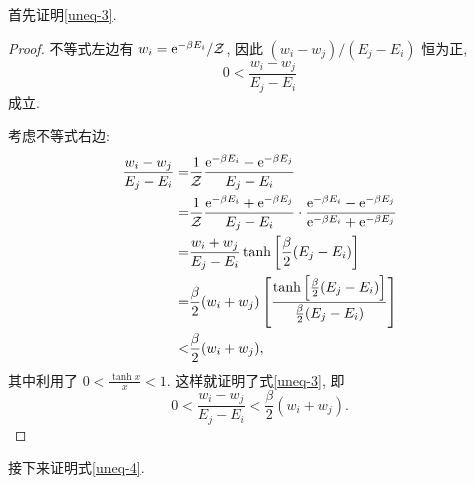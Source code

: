 首先证明\eqref{uneq-3}. 
\begin{proof}
    不等式左边有 $w_i=\mathrm{e}^{-\beta E_i}/\mathcal{Z}$, 因此 $(w_i-w_j)/(E_j-E_i)$ 恒为正,
\begin{equation}
    0<\frac{w_i-w_j}{E_j-E_i}
\end{equation}
成立.

考虑不等式右边:
  \begin{align}
        \frac{w_i-w_j}{E_j-E_i}=&\frac{1}{\mathcal{Z}}\frac{\mathrm{e}^{-\beta E_i}-\mathrm{e}^{-\beta E_j}}{E_j-E_i}\nonumber\\
        =&\frac{1}{\mathcal{Z}}\frac{\mathrm{e}^{-\beta E_i}+\mathrm{e}^{-\beta E_j}}{E_j-E_i}\cdot \frac{\mathrm{e}^{-\beta E_i}-\mathrm{e}^{-\beta E_j}}{\mathrm{e}^{-\beta E_i}+\mathrm{e}^{-\beta E_j}}\nonumber\\
        =&\frac{w_i+w_j}{E_j-E_i}\tanh \left[ \frac{\beta}{2}(E_j-E_i) \right]\nonumber\\
        =&\frac{\beta}{2}(w_i+w_j)\left[ \frac{\tanh \left[ \frac{\beta}{2}(E_j-E_i) \right]}{\frac{\beta}{2}(E_j-E_i)} \right]\nonumber\\
        <&\frac{\beta}{2}(w_i+w_j),
    \end{align}
其中利用了 $\displaystyle 0<\frac{\tanh x}{x}<1$. 这样就证明了式\eqref{uneq-3}, 即
\begin{equation}
    0<\frac{w_i-w_j}{E_j-E_i}<\frac{\beta}{2}(w_i+w_j).
\end{equation}
\end{proof}
接下来证明式\eqref{uneq-4}.
